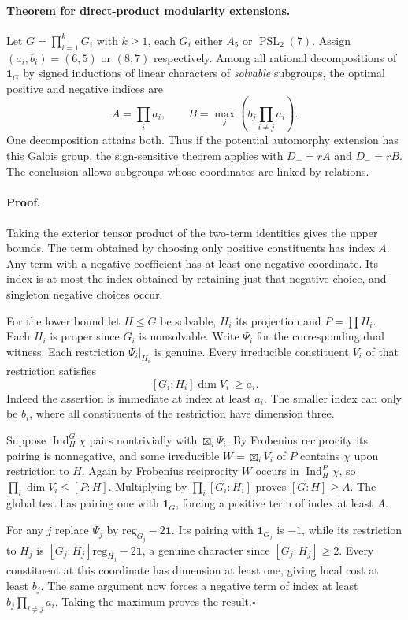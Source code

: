 \documentclass[11pt]{article}
\begin{document}
\paragraph{Theorem for direct-product modularity extensions.}
Let $G=\prod_{i=1}^k G_i$ with $k\ge1$, each $G_i$ either $A_5$ or $\operatorname{PSL}_2(7)$. Assign $(a_i,b_i)=(6,5)$ or $(8,7)$ respectively. Among all rational decompositions of $\mathbf1_G$ by signed inductions of linear characters of \emph{solvable} subgroups, the optimal positive and negative indices are
\[
 A=\prod_i a_i,\qquad B=\max_j\left(b_j\prod_{i\ne j}a_i\right).
\]
One decomposition attains both. Thus if the potential automorphy extension has this Galois group, the sign-sensitive theorem applies with $D_+=rA$ and $D_-=rB$. The conclusion allows subgroups whose coordinates are linked by relations.

\paragraph{Proof.}
Taking the exterior tensor product of the two-term identities gives the upper bounds. The term obtained by choosing only positive constituents has index $A$. Any term with a negative coefficient has at least one negative coordinate. Its index is at most the index obtained by retaining just that negative choice, and singleton negative choices occur.

For the lower bound let $H\le G$ be solvable, $H_i$ its projection and $P=\prod H_i$. Each $H_i$ is proper since $G_i$ is nonsolvable. Write $\Psi_i$ for the corresponding dual witness. Each restriction $\Psi_i|_{H_i}$ is genuine. Every irreducible constituent $V_i$ of that restriction satisfies
\[
  [G_i:H_i]\dim V_i\ \ge a_i.
\]
Indeed the assertion is immediate at index at least $a_i$. The smaller index can only be $b_i$, where all constituents of the restriction have dimension three.

Suppose $\operatorname{Ind}_H^G\chi$ pairs nontrivially with $\boxtimes_i\Psi_i$. By Frobenius reciprocity its pairing is nonnegative, and some irreducible $W=\boxtimes_i V_i$ of $P$ contains $\chi$ upon restriction to $H$. Again by Frobenius reciprocity $W$ occurs in $\operatorname{Ind}_H^P\chi$, so $\prod_i\dim V_i\le[P:H]$. Multiplying by $\prod_i[G_i:H_i]$ proves $[G:H]\ge A$. The global test has pairing one with $\mathbf1_G$, forcing a positive term of index at least $A$.

For any $j$ replace $\Psi_j$ by $\mathrm{reg}_{G_j}-2\mathbf1$. Its pairing with $\mathbf1_{G_j}$ is $-1$, while its restriction to $H_j$ is $[G_j:H_j]\mathrm{reg}_{H_j}-2\mathbf1$, a genuine character since $[G_j:H_j]\ge2$. Every constituent at this coordinate has dimension at least one, giving local cost at least $b_j$. The same argument now forces a negative term of index at least $b_j\prod_{i\ne j}a_i$. Taking the maximum proves the result.\hfill$\square$
\end{document}
